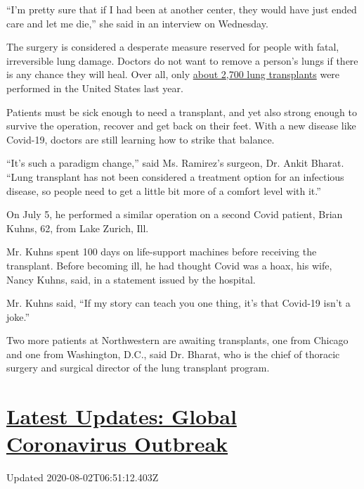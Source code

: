 ``I'm pretty sure that if I had been at another center, they would have
just ended care and let me die,'' she said in an interview on Wednesday.

The surgery is considered a desperate measure reserved for people with
fatal, irreversible lung damage. Doctors do not want to remove a
person's lungs if there is any chance they will heal. Over all, only
\href{https://unos.org/data/transplant-trends/}{about 2,700 lung
transplants} were performed in the United States last year.

Patients must be sick enough to need a transplant, and yet also strong
enough to survive the operation, recover and get back on their feet.
With a new disease like Covid-19, doctors are still learning how to
strike that balance.

``It's such a paradigm change,'' said Ms. Ramirez's surgeon, Dr. Ankit
Bharat. ``Lung transplant has not been considered a treatment option for
an infectious disease, so people need to get a little bit more of a
comfort level with it.''

On July 5, he performed a similar operation on a second Covid patient,
Brian Kuhns, 62, from Lake Zurich, Ill.

Mr. Kuhns spent 100 days on life-support machines before receiving the
transplant. Before becoming ill, he had thought Covid was a hoax, his
wife, Nancy Kuhns, said, in a statement issued by the hospital.

Mr. Kuhns said, ``If my story can teach you one thing, it's that
Covid-19 isn't a joke.''

Two more patients at Northwestern are awaiting transplants, one from
Chicago and one from Washington, D.C., said Dr. Bharat, who is the chief
of thoracic surgery and surgical director of the lung transplant
program.

\hypertarget{latest-updates-global-coronavirus-outbreak}{%
\section{\texorpdfstring{\href{https://www.nytimes.com/2020/08/01/world/coronavirus-covid-19.html?action=click\&pgtype=Article\&state=default\&region=MAIN_CONTENT_1\&context=storylines_live_updates}{Latest
Updates: Global Coronavirus
Outbreak}}{Latest Updates: Global Coronavirus Outbreak}}\label{latest-updates-global-coronavirus-outbreak}}

Updated 2020-08-02T06:51:12.403Z


